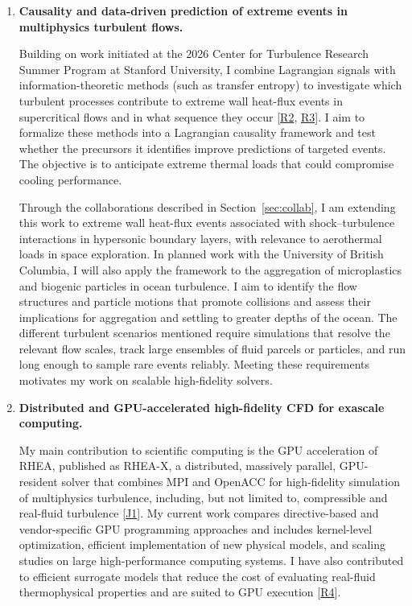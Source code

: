 \documentclass[11pt]{article}
\begin{document}
\begin{enumerate}[label=\textbf{\arabic*.}, leftmargin=*, itemsep=8pt]
	\item \textbf{Causality and data-driven prediction of extreme events in multiphysics turbulent flows.}
	
	Building on work initiated at the 2026 Center for Turbulence Research Summer Program at Stanford University, I combine Lagrangian signals with information-theoretic methods (such as transfer entropy) to investigate which turbulent processes contribute to extreme wall heat-flux events in
	supercritical flows and in what sequence they occur	[\hyperlink{pub-R2}{R2}, \hyperlink{pub-R3}{R3}]. 
	I aim to formalize these methods into a Lagrangian causality framework and test whether the precursors	it identifies improve predictions of targeted events. The objective is to anticipate extreme thermal loads that could compromise cooling performance.
	
	Through the collaborations described in Section~\ref{sec:collab}, I am extending this work to extreme wall heat-flux events associated with shock--turbulence interactions in hypersonic boundary layers, with relevance	to aerothermal loads in space exploration. In planned work with the University of British Columbia, I will also apply the framework to the aggregation
	of microplastics and biogenic particles in ocean turbulence. I aim to identify the flow structures and particle motions	that promote collisions and assess their implications for aggregation and	settling to greater depths of the ocean. 
	The different turbulent scenarios mentioned require simulations that resolve the relevant flow scales, track large ensembles of fluid parcels or particles, and run long enough to sample rare events reliably. Meeting these requirements motivates my work on scalable high-fidelity solvers.
	
	\item \textbf{Distributed and GPU-accelerated high-fidelity CFD for exascale computing.}
	
	My main contribution to scientific computing is the GPU acceleration of	RHEA, published as RHEA-X, a distributed, massively parallel, GPU-resident solver that combines MPI and OpenACC for high-fidelity simulation of multiphysics turbulence, including, but not limited to, compressible and real-fluid	turbulence [\hyperlink{pub-J1}{J1}]. My current work compares directive-based	and vendor-specific GPU programming approaches and includes kernel-level
	optimization, efficient implementation of new physical models, and scaling studies on large high-performance computing systems. I have also contributed	to efficient surrogate models that reduce the cost of evaluating real-fluid thermophysical properties and are suited to GPU execution [\hyperlink{pub-R4}{R4}].
	

\end{enumerate}
\end{document}
